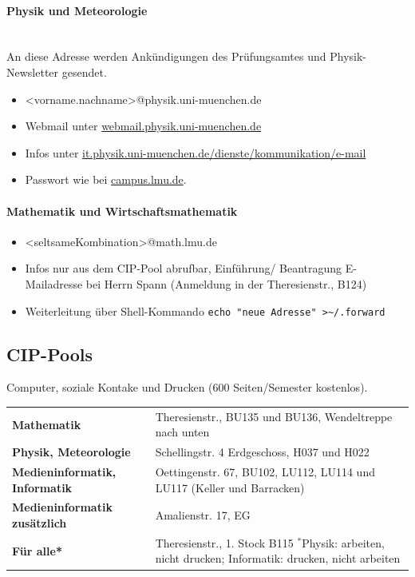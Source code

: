 \documentclass[twoside,12pt,parskip=half-]{scrartcl}
\begin{document}
\paragraph{Physik und Meteorologie}\hfill\\
An diese Adresse werden Ankündigungen des Prüfungsamtes und
Physik-Newsletter gesendet.

\begin{itemize}
	\item <vorname.nachname>@physik.uni-muenchen.de
	\item Webmail unter \url{webmail.physik.uni-muenchen.de}
	\item Infos unter \url{it.physik.uni-muenchen.de/dienste/kommunikation/e-mail}
        \item Passwort wie bei \url{campus.lmu.de}.
\end{itemize}

\paragraph{Mathematik und Wirtschaftsmathematik}
\begin{itemize}
	\item <seltsameKombination>@math.lmu.de
	\item Infos nur aus dem CIP-Pool abrufbar, Einführung/ Beantragung E-Mailadresse bei Herrn Spann (Anmeldung in der Theresienstr., B124)
	\item Weiterleitung über Shell-Kommando \verb|echo "neue Adresse" >~/.forward|
\end{itemize}

\subsection{CIP-Pools}
Computer, soziale Kontake und Drucken (600 Seiten/Semester kostenlos).\\

\begin{tabular}{l p{10cm}}
\textbf{Mathematik}	&	Theresienstr., BU135 und BU136, \newline Wendeltreppe nach unten\\

\textbf{Physik, Meteorologie}	&	Schellingstr. 4 Erdgeschoss, H037 und H022\\
\textbf{Medieninformatik, Informatik}	&	Oettingenstr. 67, BU102, LU112, LU114 und LU117 (Keller und Barracken)\\
\textbf{Medieninformatik zusätzlich}	&	Amalienstr. 17, EG\\
\textbf{Für alle*}	&	Theresienstr., 1. Stock B115\newline
\footnotesize{$^*$Physik: arbeiten, nicht drucken; \newline Informatik: drucken, nicht arbeiten}

\end{tabular}
\end{document}
